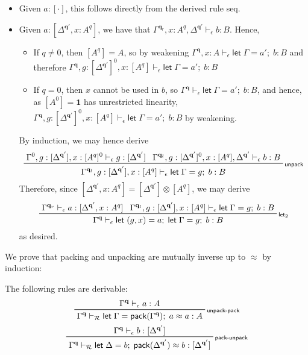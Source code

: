 \documentclass[acmsmall,screen,review]{acmart}
\newcommand{\mc}[1]{\ensuremath{\mathcal{#1}}}
\newcommand{\mb}[1]{\ensuremath{\mathbf{#1}}}
\newcommand{\ms}[1]{\ensuremath{\mathsf{#1}}}
\newcommand{\letexpr}[3]{\ensuremath{\ms{let}\;#1 = #2;\;#3}}
\newcommand{\rle}[1]{{\scriptsize\textsf{#1}}}
\newcommand{\hasty}[4]{#1 \vdash_{#2} #3: {#4}}
\newcommand{\teqv}{\approx}
\newcommand{\tmeq}[5]{#1 \vdash_{#2} #3 \teqv #4 : {#5}}
\newcommand{\brle}[1]{{\textsf{#1}}}
\newcommand{\etoty}[1]{[#1]}
\begin{document}
\begin{itemize}
  \item Given $a : \etoty{\cdot}$, this follows directly from the derived rule
  \brle{seq}.
  \item Given $a : \etoty{\Delta^{\mb{q}'}, x : A^q}$, we have that
  $\hasty{\Gamma^{\mb{q}_r}, x : A^q, \Delta^{\mb{q}'}}{\epsilon}{b}{B}$. Hence,
  \begin{itemize}
    \item If $q \neq 0$, then $[A^q] = A$, so by weakening $\hasty{\Gamma^{\mb{q}}, x :
    A}{\epsilon}{\letexpr{\Gamma}{a'}{b}}{B}$ and therefore $\hasty{\Gamma^{\mb{q}}, g:
    [\Delta^{\mb{q}'}]^0, x : [A^q]}{\epsilon}{\letexpr{\Gamma}{a'}{b}}{B}$
    \item If $q = 0$, then $x$ cannot be used in $b$, so
    $\hasty{\Gamma^{\mb{q}}}{\epsilon}{\letexpr{\Gamma}{a'}{b}}{B}$, and hence, as $[A^0] = \mb{1}$
    has unrestricted linearity, $\hasty{\Gamma^{\mb{q}}, g: [\Delta^{\mb{q}'}]^0, x :
    [A^q]}{\epsilon}{\letexpr{\Gamma}{a'}{b}}{B}$ by weakening.
  \end{itemize}
  By induction, we may hence derive
  \begin{equation*}
  \prftree[r]{\rle{unpack}}
    {\hasty{\Gamma^0, g: [\Delta^{\mb{q}'}], x : [A^q]^0}{\epsilon}{g}{[\Delta^{\mb{q}'}]}}
    {\hasty{\Gamma^{\mb{q}_l}, g: [\Delta^{\mb{q}'}]^0, x : [A^q], \Delta^{\mb{q}'}}{\epsilon}{b}{B}}
    {\hasty{\Gamma^{\mb{q}_l}, g: [\Delta^{\mb{q}'}], x : [A^q]}{\epsilon}{\letexpr{\Gamma}{g}{b}}{B}}
  \end{equation*}
  Therefore, since $[\Delta^{\mb{q}'}, x : A^q] = [\Delta^{\mb{q}'}] \otimes [A^q]$, we may derive
  \begin{equation*}
  \prftree[r]{\rle{let$_2$}}
    {\hasty{\Gamma^{\mb{q}_r}}{\epsilon}{a}{[\Delta^{\mb{q}'}, x : A^q]}}
    {\hasty{\Gamma^{\mb{q}_l}, g: [\Delta^{\mb{q}'}], x : [A^q]}{\epsilon}{\letexpr{\Gamma}{g}{b}}{B}}
    {\hasty{\Gamma^{\mb{q}}}{\epsilon}{\letexpr{(g, x)}{a}{\letexpr{\Gamma}{g}{b}}}{B}}
  \end{equation*}
  as desired.
\end{itemize}
We prove that packing and unpacking are mutually inverse up to $\approx$ by induction:
\begin{lemma}
  The following rules are derivable:
  \begin{gather*}
  \prftree[r]{\rle{unpack-pack}}
    {\hasty{\Gamma^{\mb{q}}}{\epsilon}{a}{A}}
    {\tmeq{\Gamma^{\mb{q}}}{\mc{R}}{\letexpr{\Gamma}{\ms{pack}(\Gamma^{\mb{q}})}{a}}{a}{A}}
    \\
  \prftree[r]{\rle{pack-unpack}}
    {\hasty{\Gamma^{\mb{q}}}{\epsilon}{b}{[\Delta^{\mb{q}'}]}}
    {\tmeq{\Gamma^{\mb{q}}}{\mc{R}}{\letexpr{\Delta}{b}{\ms{pack}(\Delta^{\mb{q}'})}}{b}{[\Delta^{\mb{q}'}]}}
  \end{gather*}
\end{lemma}
\end{document}
